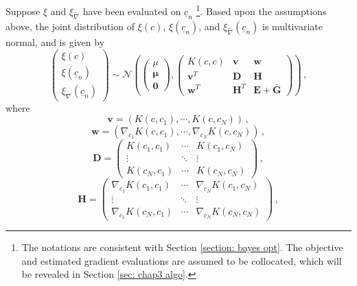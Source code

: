 Suppose $\xi$ and
$\xi_{\tilde{\nabla}}$ have been evaluated on $\underline{c}_n$ \footnote{
The notations are consistent with Section \ref{section: bayes opt}. The objective
and estimated gradient evaluations are assumed to be collocated, which will be revealed
in Section \ref{sec: chap3 algo}. }.
Based upon the assumptions above, 
the joint distribution of $\xi(c)$, $\xi(\underline{c}_n)$, and $\xi_{\tilde{\nabla}}
(\underline{c}_n)$ is multivariate normal, and is given by
\begin{equation}
    \begin{pmatrix}
        \xi(c) \\ \xi(\underline{c}_n) \\ \xi_{\tilde{\nabla}}(\underline{c}_n)
    \end{pmatrix}
    \sim
    \mathcal{N}\left(
    \begin{pmatrix}
        \mu\\
        \boldsymbol{\mu}\\
        \boldsymbol{0}
    \end{pmatrix} ,
    \begin{pmatrix}
        K(c,c) & \boldsymbol{v} & \boldsymbol{w}\\
        \boldsymbol{v}^T & \boldsymbol{D} & \boldsymbol{H}\\
        \boldsymbol{w}^T & \boldsymbol{H}^T & \boldsymbol{E} +\overline{\boldsymbol{G}}
    \end{pmatrix}
    \right)\,,
    \label{eqn: joint dis}
\end{equation}
where
\begin{equation}
    \boldsymbol{v} = \left(K(c, c_1), \cdots, K(c,c_N) \right)\,,
\end{equation}
\begin{equation}
    \boldsymbol{w} = \left(\nabla_{c_1} K(c, c_1),\cdots, \nabla_{c_N} K(c, c_N) \right)\,,
\end{equation}
\begin{equation}
    \boldsymbol{D} = \begin{pmatrix}
        K(c_1, c_1) & \cdots & K(c_1, c_N) \\
        \vdots & \ddots & \vdots \\
        K(c_N, c_1) & \cdots & K(c_N, c_N)
    \end{pmatrix}\,,
\end{equation}
\begin{equation}
    \boldsymbol{H} = \begin{pmatrix}
        \nabla_{c_1} K(c_1, c_1) & \cdots & \nabla_{c_N} K(c_1, c_N) \\
        \vdots & \ddots & \vdots\\
        \nabla_{c_1} K(c_N, c_1) & \cdots & \nabla_{c_N} K(c_N, c_N) 
    \end{pmatrix}\,,
    \label{eqn: joint H}
\end{equation}
